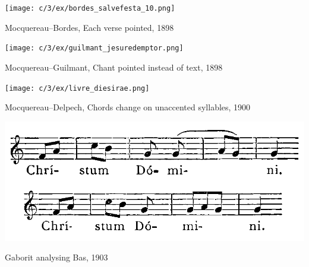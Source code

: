 \vspace*{\fill}

\newpage

\vspace*{\fill}

\begin{example}
  \centering
  \texttt{[image: c/3/ex/bordes\_salvefesta\_10.png]}
  \caption{Mocquereau--Bordes, Each verse pointed, 1898}
  \label{mus:bordes_salvefesta_10}
\end{example}

\vspace*{\fill}

\begin{example}
  \centering
  \texttt{[image: c/3/ex/guilmant\_jesuredemptor.png]}
  \caption{Mocquereau--Guilmant, Chant pointed instead of text, 1898}
  \label{mus:guilmant_jesu}
\end{example}

\vspace*{\fill}

\newpage

\vspace*{\fill}

\begin{example}
  \centering
  \texttt{[image: c/3/ex/livre\_diesirae.png]}
  \caption{Mocquereau--Delpech, Chords change on unaccented syllables, 1900}
  \label{mus:livre_diesirae_142}
\end{example}

\vspace*{\fill}

\begin{example}
  \centering
  \includegraphics[width=.8\linewidth]{c/4/ex/bas_gaborit_19.png}
  \caption{Gaborit analysing Bas, 1903}
  \label{mus:bas_gaborit_19}
\end{example}

\vspace*{\fill}

\newpage

\vspace*{\fill}

